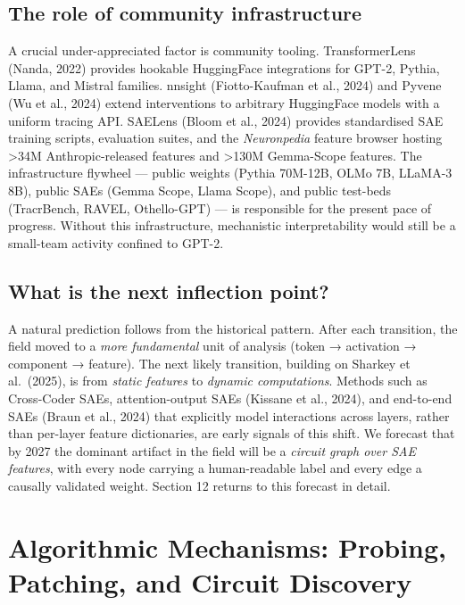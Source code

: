 \subsection{The role of community infrastructure}\label{the-role-of-community-infrastructure}

A crucial under-appreciated factor is community tooling. TransformerLens (Nanda, 2022) provides hookable HuggingFace integrations for GPT-2, Pythia, Llama, and Mistral families. nnsight (Fiotto-Kaufman et al., 2024) and Pyvene (Wu et al., 2024) extend interventions to arbitrary HuggingFace models with a uniform tracing API. SAELens (Bloom et al., 2024) provides standardised SAE training scripts, evaluation suites, and the \emph{Neuronpedia} feature browser hosting \textgreater34M Anthropic-released features and \textgreater130M Gemma-Scope features. The infrastructure flywheel --- public weights (Pythia 70M-12B, OLMo 7B, LLaMA-3 8B), public SAEs (Gemma Scope, Llama Scope), and public test-beds (TracrBench, RAVEL, Othello-GPT) --- is responsible for the present pace of progress. Without this infrastructure, mechanistic interpretability would still be a small-team activity confined to GPT-2.

\subsection{What is the next inflection point?}\label{what-is-the-next-inflection-point}

A natural prediction follows from the historical pattern. After each transition, the field moved to a \emph{more fundamental} unit of analysis (token → activation → component → feature). The next likely transition, building on Sharkey et al.~(2025), is from \emph{static features} to \emph{dynamic computations}. Methods such as Cross-Coder SAEs, attention-output SAEs (Kissane et al., 2024), and end-to-end SAEs (Braun et al., 2024) that explicitly model interactions across layers, rather than per-layer feature dictionaries, are early signals of this shift. We forecast that by 2027 the dominant artifact in the field will be a \emph{circuit graph over SAE features}, with every node carrying a human-readable label and every edge a causally validated weight. Section 12 returns to this forecast in detail.

\section{Algorithmic Mechanisms: Probing, Patching, and Circuit Discovery}\label{algorithmic-mechanisms-probing-patching-and-circuit-discovery}


